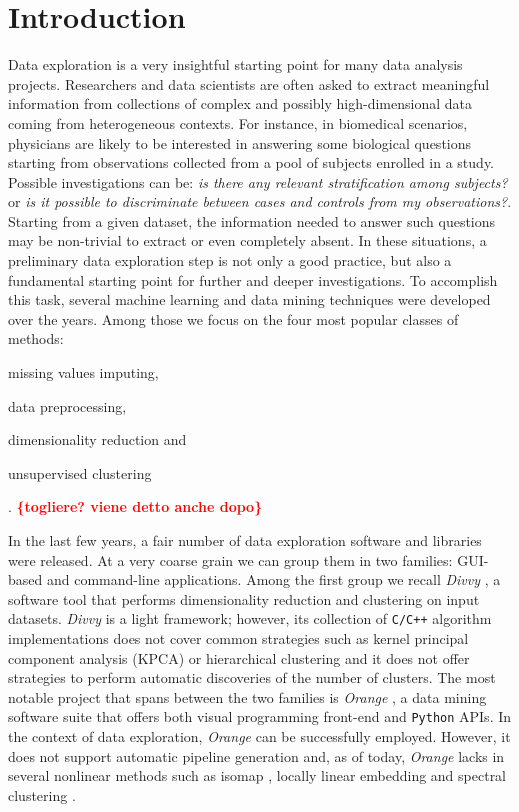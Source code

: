 \documentclass[twoside,11pt]{article}
\makeatletter
\newcommand{\py}{\texttt{Python}\@\xspace}
\newcommand{\todo}[1]{\textcolor{red}{{\bf \{#1\}}}} %
\makeatother
\begin{document}
\section{Introduction}\label{sec:intro}
Data exploration is a very insightful starting point for many data analysis projects. Researchers and data scientists are often asked to extract meaningful information from collections of complex and possibly high-dimensional data coming from heterogeneous contexts. For instance, in biomedical scenarios, physicians are likely to be interested in answering some biological questions starting from observations collected from a pool of subjects enrolled in a study. Possible investigations can be: \emph{is there any relevant stratification among subjects?} or \emph{is it possible to discriminate between cases and controls from my observations?}. Starting from a given dataset, the information needed to answer such questions may be non-trivial to extract or even completely absent.
In these situations, a preliminary data exploration step is not only a good practice, but also a fundamental starting point for further and deeper investigations. To accomplish this task, several machine learning and data mining techniques were developed over the years. 
Among those we focus on the four most popular classes of methods: \begin{enumerate*}[label=(\roman*)]
  \item missing values imputing,
  \item data preprocessing,
  \item dimensionality reduction and
  \item unsupervised clustering
\end{enumerate*}. \todo{togliere? viene detto anche dopo}

In the last few years, a fair number of data exploration software and libraries were released. At a very coarse grain we can group them in two families: GUI-based and command-line applications. 
Among the first group we recall \emph{Divvy} \citep{lewis2013divvy}, a software tool that performs dimensionality reduction and clustering on input datasets. \emph{Divvy} is a light framework; however, 
its collection of \texttt{C/C++} algorithm implementations does not cover common strategies such as kernel principal component analysis (KPCA) \citep{scholkopf1997kernel} or hierarchical clustering \citep{friedman2001elements} and it does not offer strategies to perform automatic discoveries of the number of clusters. 
The most notable project that spans between the two families is \emph{Orange} \citep{demvsar2013orange}, a data mining software suite that offers both visual programming front-end and \py APIs. In the context of data exploration, \emph{Orange} can be successfully employed. However, it does not support automatic pipeline generation
and, as of today, \emph{Orange} lacks in several nonlinear methods such as isomap \citep{tenenbaum2000global}, locally linear embedding \citep{roweis2000nonlinear} and spectral clustering \citep{shi2000normalized}.
\end{document}
